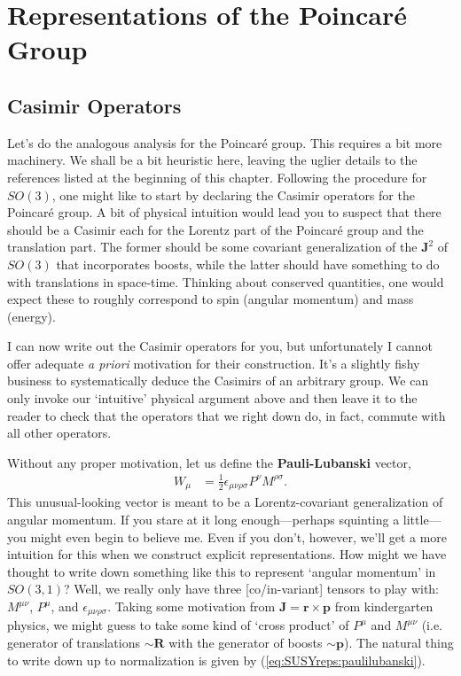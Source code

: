 \documentclass[12pt, oneside]{report}    %
\let\oldsection\section
\def\section{%
  \setcounter{sidenote}{1}%
  \oldsection
}
\begin{document}
\section{Representations of the Poincar\'e Group}

\subsection{Casimir Operators}

Let's do the analogous analysis for the Poincar\'e group. This requires a bit more machinery. We shall be a bit heuristic here, leaving the uglier details to the references listed at the beginning of this chapter. Following the procedure for $SO(3)$, one might like to start by declaring the Casimir operators for the Poincar\'e group. A bit of physical intuition would lead you to suspect that there should be a Casimir each for the Lorentz part of the Poincar\'e group and the translation part. The former should be some covariant generalization of the $\mathbf{J}^2$ of $SO(3)$ that incorporates boosts, while the latter should have something to do with translations in space-time. Thinking about conserved quantities, one would expect these to roughly correspond to spin (angular momentum) and mass (energy).

I can now write out the Casimir operators for you, but unfortunately I cannot offer adequate \textit{a priori} motivation for their construction. It's a slightly fishy business to systematically deduce the Casimirs of an arbitrary group. We can only invoke our `intuitive' physical argument above and then leave it to the reader to check that the operators that we right down do, in fact, commute with all other operators. 


Without any proper motivation, let us define the \textbf{Pauli-Lubanski} vector,
\begin{align}
    W_\mu &= \frac 12 \epsilon_{\mu\nu\rho\sigma} P^\nu M^{\rho\sigma}.\label{eq:SUSYreps:paulilubanski}
\end{align}
This unusual-looking vector is meant to be a Lorentz-covariant generalization of angular momentum. If you stare at it long enough---perhaps squinting a little---you might even begin to believe me. Even if you don't, however, we'll get a more intuition for this when we construct explicit representations. How might we have thought to write down something like this to represent `angular momentum' in $SO(3,1)$? Well, we really only have three [co/in-variant] tensors to play with: $M^{\mu\nu}$, $P^\mu$, and $\epsilon_{\mu\nu\rho\sigma}$. Taking some motivation from $\mathbf{J}=\mathbf{r}\times\mathbf{p}$ from kindergarten physics, we might guess to take some kind of `cross product' of $P^\mu$ and $M^{\mu\nu}$ (i.e. generator of translations $\sim \mathbf{R}$ with the generator of boosts $\sim \mathbf{p}$). The natural thing to write down up to normalization is given by  (\ref{eq:SUSYreps:paulilubanski}).
\end{document}
